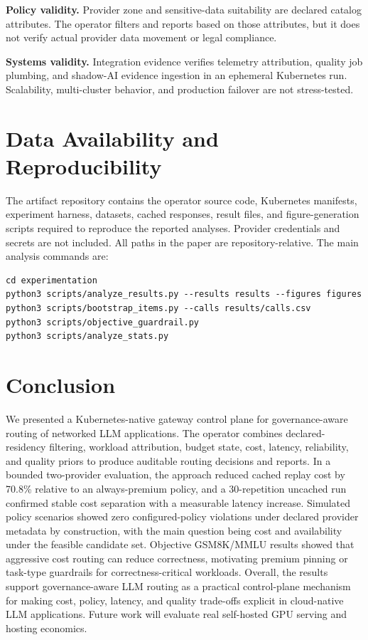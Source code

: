 \documentclass[10pt,journal,compsoc]{IEEEtran}
\begin{document}
\textbf{Policy validity.} Provider zone and sensitive-data suitability are
declared catalog attributes. The operator filters and reports based on those
attributes, but it does not verify actual provider data movement or legal
compliance.

\textbf{Systems validity.} Integration evidence verifies telemetry attribution,
quality job plumbing, and shadow-AI evidence ingestion in an ephemeral
Kubernetes run. Scalability, multi-cluster behavior, and production failover are
not stress-tested.

\section{Data Availability and Reproducibility}
The artifact repository contains the operator source code, Kubernetes manifests,
experiment harness, datasets, cached responses, result files, and
figure-generation scripts required to reproduce the reported analyses. Provider
credentials and secrets are not included. All paths in the paper are
repository-relative. The main analysis commands are:
\begin{verbatim}
cd experimentation
python3 scripts/analyze_results.py --results results --figures figures
python3 scripts/bootstrap_items.py --calls results/calls.csv
python3 scripts/objective_guardrail.py
python3 scripts/analyze_stats.py
\end{verbatim}

\section{Conclusion}
We presented a Kubernetes-native gateway control plane for governance-aware
routing of networked LLM applications. The operator combines declared-residency
filtering, workload attribution, budget state, cost, latency, reliability, and
quality priors to produce auditable routing decisions and reports. In a bounded
two-provider evaluation, the approach reduced cached replay cost by 70.8\%
relative to an always-premium policy, and a 30-repetition uncached run confirmed
stable cost separation with a measurable latency increase. Simulated policy
scenarios showed zero configured-policy violations under declared provider
metadata by construction, with the main question being cost and availability
under the feasible candidate set. Objective GSM8K/MMLU results showed that
aggressive cost routing can reduce correctness, motivating premium pinning or
task-type guardrails for correctness-critical workloads. Overall, the results
support governance-aware LLM routing as a practical control-plane mechanism for
making cost, policy, latency, and quality trade-offs explicit in cloud-native
LLM applications. Future work will evaluate real self-hosted GPU serving and
hosting economics.



\end{document}
